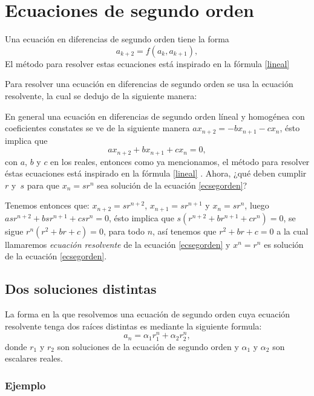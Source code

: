 \documentclass{report}
\begin{document}
\chapter{Ecuaciones de segundo orden}

Una ecuación en diferencias de segundo orden tiene la forma
\begin{equation}
  \label{ecsegorden1}
  a_{k+2}=f(a_k,a_{k+1}),
\end{equation}
El método para resolver estas ecuaciones está inspirado en la fórmula \eqref{lineal} 

Para resolver una ecuación en diferencias de segundo orden se usa la
ecuación resolvente, la cual se dedujo de la siguiente manera:

En general una ecuación en diferencias de segundo orden líneal y homogénea con coeficientes constates se ve de la
siguiente manera $ax_{n+2}=-bx_{n+1}-cx_{n}$, ésto implica que
\begin{equation}
  \label{ecsegorden}
  ax_{n+2}+bx_{n+1}+cx_{n}=0,
\end{equation}
con $a$, $b$ y $c$ en los reales, entonces como ya mencionamos, el método
para resolver éstas ecuaciones está inspirado en la fórmula \eqref{lineal}
. Ahora, ¿qué deben cumplir $r$ y~$s$ para que $x_n=sr^n$
sea solución de la ecuación \eqref{ecsegorden}?

Tenemos entonces que: $x_{n+2}=sr^{n+2}$, $x_{n+1}=sr^{n+1}$ y
$x_{n}=sr^{n}$, luego $asr^{n+2}+bsr^{n+1}+csr^n=0$, ésto implica que
$s(r^{n+2}+br^{n+1}+cr^n)=0$, se sigue $r^n(r^2+br+c)=0$, para todo
$n$, así tenemos que $r^2+br+c=0$ a la cual llamaremos
\textit{ecuación resolvente} de la ecuación \eqref{ecsegorden} y
$x^n=r^n$ es solución de la ecuación \eqref{ecsegorden}.



\section{Dos soluciones distintas}
\label{sec:distintas}
La forma en la que resolvemos una ecuación de segundo orden cuya
ecuación resolvente tenga dos raíces distintas es mediante la
siguiente formula:
\begin{equation}
 \label{raicesdistintas}
 a_n=\alpha_1r_1^n +\alpha_2r_2^n,
\end{equation}
donde $r_1$ y $r_2$ son soluciones de la ecuación de segundo orden y
$\alpha_1$ y $\alpha_2$ son escalares reales.
\subsection{Ejemplo}
\end{document}
